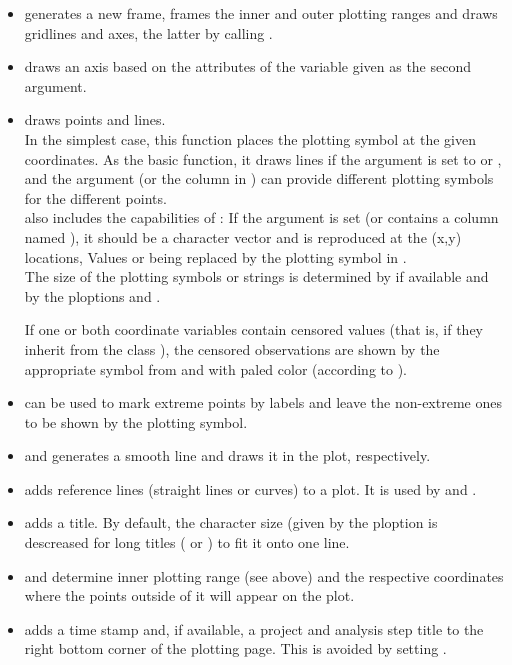 \documentclass[11pt]{article}\usepackage[]{graphicx}\usepackage[]{color}
\begin{document}
\begin{itemize}
\item 
   generates a new frame, frames the inner and outer plotting
  ranges and draws gridlines and axes, the latter by calling . 
\item
   draws an axis based on the attributes of the variable given as
  the second argument.   
\item
{} draws points and lines. \\
  In the simplest case, this function places the plotting symbol at the
  given coordinates. As the basic  function, it draws lines if 
  the argument  is set to  or , and the argument
   (or the column  in ) can provide
  different plotting symbols for the different points.\\

   also includes the capabilities of : 
  If the argument  
  is set (or  contains a column named ),
  it should be a character vector and is reproduced at the (x,y) locations,
  Values  or  being replaced by the plotting symbol in .\\
  The size of the plotting symbols or strings is determined by
   if available and by the ploptions
   and .

  If one or both coordinate variables contain censored values (that is,
  if they inherit from the class ), the censored observations are
  shown by the appropriate symbol from \Hneed{80mm}
   and 
  with paled color (according to ).
\item
   can be used to mark extreme points by labels and leave the
  non-extreme ones to be shown by the plotting symbol.
\item
   and  generates a smooth line and draws it 
  in the plot, respectively.
\item
   adds reference lines (straight lines or curves) to a plot.
  It is used by  and .
\item
   adds a title. By default, the character size 
  (given by the ploption  is descreased
  for long titles ( or ) to fit it onto one line.
\item
   and  determine inner plotting range 
  (see above) and the respective coordinates where the points outside of it
  will appear on the plot.
\item
   adds a time stamp and, if available, a project and analysis
  step title to the right bottom corner of the plotting page.
  This is avoided by setting .
\end{itemize}
\end{document}
